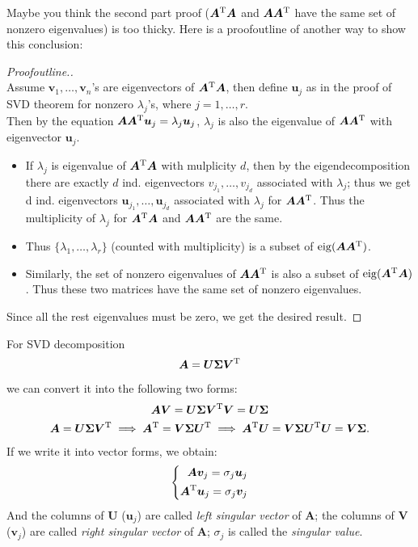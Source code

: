 \begin{remark}
Maybe you think the second part proof ($\bm A^{\mathrm T}\bm A$ and $\bm A\bm A^{\mathrm T}$ have the same set of nonzero eigenvalues) is too thicky. Here is a proofoutline of another way to show this conclusion:
\begin{proof}[Proofoutline.]\qquad\\
Assume $\bm v_1,\dots,\bm v_n$'s are eigenvectors of $\bm A^{\mathrm T}\bm A$, then define $\bm u_j$ as in the proof of SVD theorem for nonzero $\lambda_j$'s, where $j=1,\dots,r.$ \\
Then by the equation $\bm A\bm A^{\mathrm T}\bm u_j = \lambda_j\bm u_j$, $\lambda_j$ is also the eigenvalue of $\bm A\bm A^{\mathrm T}$ with eigenvector $\bm u_j$. 
\begin{itemize}
\item
If $\lambda_j$ is eigenvalue of $\bm A^{\mathrm T}\bm A$ with mulplicity $d$, then by the eigendecomposition there are exactly $d$ ind. eigenvectors $v_{j_1},\dots, v_{j_d}$ associated with $\lambda_j$; thus we get d ind. eigenvectors $\bm u_{j_1},\dots, \bm u_{j_d}$ associated with $\lambda_j$ for $\bm A\bm A^{\mathrm T}$. Thus the multiplicity of $\lambda_j$ for $\bm A^{\mathrm T} \bm A$ and $\bm A\bm A^{\mathrm T}$ are the same.
\item
Thus $\{\lambda_1, \dots, \lambda_r\}$ (counted with multiplicity) is a subset of $\operatorname{eig}(\bm A\bm A^{\mathrm T})$.
\item
Similarly, the set of nonzero eigenvalues of $\bm A\bm A^{\mathrm T}$ is also a subset of $\operatorname{eig}(\bm A^{\mathrm T}\bm A)$. Thus these two matrices have the same set of nonzero eigenvalues.
\end{itemize}
   Since all the rest eigenvalues must be zero, we get the desired result. 
\end{proof}
\end{remark}

For SVD decomposition
\[
\bm A=\bm U\bm\Sigma\bm V^{\mathrm T}
\]
we can convert it into the following two forms:
\begin{gather*}
\bm A\bm V=\bm U\bm\Sigma\bm V^{\mathrm T}\bm V=\bm U\bm\Sigma\\
\bm A=\bm U\bm\Sigma\bm V^{\mathrm T}\implies
\bm A^{\mathrm T}=\bm V\bm\Sigma\bm U^{\mathrm T}\implies
\bm A^{\mathrm T}\bm U=\bm V\bm\Sigma\bm U^{\mathrm T}\bm U=\bm V\bm\Sigma.
\end{gather*}
If we write it into vector forms, we obtain:
\[
\left\{
\begin{aligned}
\bm A\bm v_j=\sigma_j\bm u_j\\
\bm A^{\mathrm T}\bm u_j=\sigma_j\bm v_j
\end{aligned}
\right.
\]
And the columns of $\bm U$ ($\bm u_j$) are called \emph{left singular vector} of $\bm A$; the columns of $\bm V$ ($\bm v_j$) are called \emph{right singular vector} of $\bm A$; $\sigma_j$ is called the \emph{singular value}.
